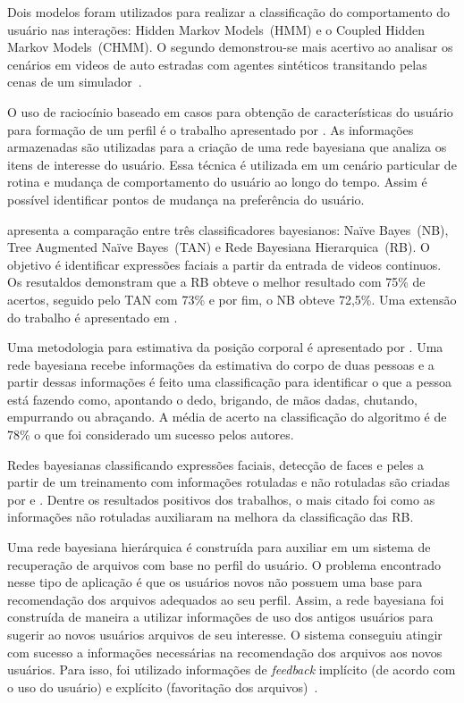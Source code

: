 Dois modelos foram utilizados para realizar a classificação do comportamento do usuário nas interações: Hidden Markov Models~(HMM) e o Coupled Hidden Markov Models~(CHMM). O segundo demonstrou-se mais acertivo ao analisar os cenários em videos de auto estradas com agentes sintéticos transitando pelas cenas de um simulador~\cite{oliver:2000}.

O uso de raciocínio baseado em casos para obtenção de características do usuário para formação de um perfil é o trabalho apresentado por . As informações armazenadas são utilizadas para a criação de uma rede bayesiana que analiza os itens de interesse do usuário. Essa técnica é utilizada em um cenário particular de rotina e mudança de comportamento do usuário ao longo do tempo. Assim é possível identificar pontos de mudança na preferência do usuário.

 apresenta a comparação entre três classificadores bayesianos: Naïve Bayes~(NB), Tree Augmented Naïve Bayes~(TAN) e Rede Bayesiana Hierarquica~(RB). O objetivo é identificar expressões faciais a partir da entrada de videos continuos. Os resutaldos demonstram que a RB obteve o melhor resultado com 75\% de acertos, seguido pelo TAN com 73\% e por fim, o NB obteve 72,5\%. Uma extensão do trabalho é apresentado em .

Uma metodologia para estimativa da posição corporal é apresentado por . Uma rede bayesiana recebe informações da estimativa do corpo de duas pessoas e a partir dessas informações é feito uma classificação para identificar o que a pessoa está fazendo como, apontando o dedo, brigando, de mãos dadas, chutando, empurrando ou abraçando. A média de acerto na classificação do algoritmo é de 78\% o que foi considerado um sucesso pelos autores.

Redes bayesianas classificando expressões faciais, detecção de faces e peles a partir de um treinamento com informações rotuladas e não rotuladas são criadas por  e . Dentre os resultados positivos dos trabalhos, o mais citado foi como as informações não rotuladas auxiliaram na melhora da classificação das RB.

Uma rede bayesiana hierárquica é construída para auxiliar em um sistema de recuperação de arquivos com base no perfil do usuário. O problema encontrado nesse tipo de aplicação é que os usuários novos não possuem uma base para recomendação dos arquivos adequados ao seu perfil. Assim, a rede bayesiana foi construída de maneira a utilizar informações de uso dos antigos usuários para sugerir ao novos usuários arquivos de seu interesse. O sistema conseguiu atingir com sucesso a informações necessárias na recomendação dos arquivos aos novos usuários. Para isso, foi utilizado informações de \emph{feedback} implícito (de acordo com o uso do usuário) e explícito (favoritação dos arquivos)~\cite{zigoris:2006}.

